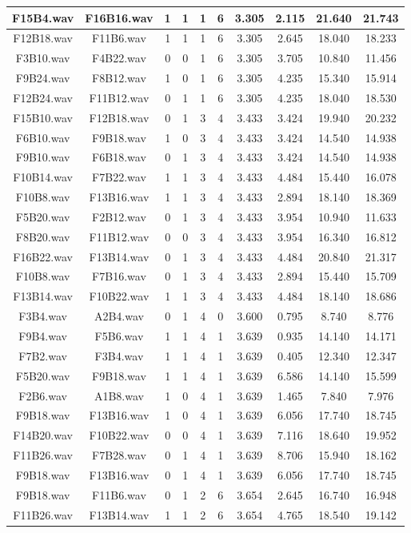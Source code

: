 \documentclass[11pt,a4paper]{book}
\begin{document}
\begin{longtable}[c]{|c|c|c|c|c|c|c|c|c|c|}
F15B4.wav&F16B16.wav&1&1&1&6&3.305&2.115&21.640&21.743\\ \hline
F12B18.wav&F11B6.wav&1&1&1&6&3.305&2.645&18.040&18.233\\ \hline
F3B10.wav&F4B22.wav&0&0&1&6&3.305&3.705&10.840&11.456\\ \hline
F9B24.wav&F8B12.wav&1&0&1&6&3.305&4.235&15.340&15.914\\ \hline
F12B24.wav&F11B12.wav&0&1&1&6&3.305&4.235&18.040&18.530\\ \hline
F15B10.wav&F12B18.wav&0&1&3&4&3.433&3.424&19.940&20.232\\ \hline
F6B10.wav&F9B18.wav&1&0&3&4&3.433&3.424&14.540&14.938\\ \hline
F9B10.wav&F6B18.wav&0&1&3&4&3.433&3.424&14.540&14.938\\ \hline
F10B14.wav&F7B22.wav&1&1&3&4&3.433&4.484&15.440&16.078\\ \hline
F10B8.wav&F13B16.wav&1&1&3&4&3.433&2.894&18.140&18.369\\ \hline
F5B20.wav&F2B12.wav&0&1&3&4&3.433&3.954&10.940&11.633\\ \hline
F8B20.wav&F11B12.wav&0&0&3&4&3.433&3.954&16.340&16.812\\ \hline
F16B22.wav&F13B14.wav&0&1&3&4&3.433&4.484&20.840&21.317\\ \hline
F10B8.wav&F7B16.wav&0&1&3&4&3.433&2.894&15.440&15.709\\ \hline
F13B14.wav&F10B22.wav&1&1&3&4&3.433&4.484&18.140&18.686\\ \hline
F3B4.wav&A2B4.wav&0&1&4&0&3.600&0.795&8.740&8.776\\ \hline
F9B4.wav&F5B6.wav&1&1&4&1&3.639&0.935&14.140&14.171\\ \hline
F7B2.wav&F3B4.wav&1&1&4&1&3.639&0.405&12.340&12.347\\ \hline
F5B20.wav&F9B18.wav&1&1&4&1&3.639&6.586&14.140&15.599\\ \hline
F2B6.wav&A1B8.wav&1&0&4&1&3.639&1.465&7.840&7.976\\ \hline
F9B18.wav&F13B16.wav&1&0&4&1&3.639&6.056&17.740&18.745\\ \hline
F14B20.wav&F10B22.wav&0&0&4&1&3.639&7.116&18.640&19.952\\ \hline
F11B26.wav&F7B28.wav&0&1&4&1&3.639&8.706&15.940&18.162\\ \hline
F9B18.wav&F13B16.wav&0&1&4&1&3.639&6.056&17.740&18.745\\ \hline
F9B18.wav&F11B6.wav&0&1&2&6&3.654&2.645&16.740&16.948\\ \hline
F11B26.wav&F13B14.wav&1&1&2&6&3.654&4.765&18.540&19.142\\ \hline

\end{longtable}
\end{document}
